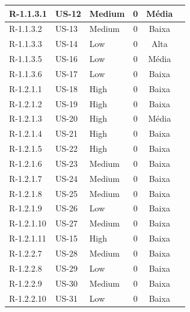 \begin{table}
\begin{tabular}{ | l | l | l | c | c | c |}
R-1.1.3.1  & US-12 & Medium   & 0                & Média       &                 \\\hline
R-1.1.3.2  & US-13 & Medium   & 0                & Baixa       &                 \\\hline
R-1.1.3.3  & US-14 & Low      & 0                & Alta        &                 \\\hline
R-1.1.3.5  & US-16 & Low      & 0                & Média       &                 \\\hline
R-1.1.3.6  & US-17 & Low      & 0                & Baixa       &                 \\\hline
R-1.2.1.1  & US-18 & High     & 0                & Baixa       &                 \\\hline
R-1.2.1.2  & US-19 & High     & 0                & Baixa       &                 \\\hline
R-1.2.1.3  & US-20 & High     & 0                & Média       &                 \\\hline
R-1.2.1.4  & US-21 & High     & 0                & Baixa       &                 \\\hline
R-1.2.1.5  & US-22 & High     & 0                & Baixa       &                 \\\hline
R-1.2.1.6  & US-23 & Medium   & 0                & Baixa       &                 \\\hline
R-1.2.1.7  & US-24 & Medium   & 0                & Baixa       &                 \\\hline
R-1.2.1.8  & US-25 & Medium   & 0                & Baixa       &                 \\\hline
R-1.2.1.9  & US-26 & Low      & 0                & Baixa       &                 \\\hline
R-1.2.1.10 & US-27 & Medium   & 0                & Baixa       &                 \\\hline
R-1.2.1.11 & US-15 & High     & 0                & Baixa       &                 \\\hline
R-1.2.2.7  & US-28 & Medium   & 0                & Baixa       &                 \\\hline
R-1.2.2.8  & US-29 & Low      & 0                & Baixa       &                 \\\hline
R-1.2.2.9  & US-30 & Medium   & 0                & Baixa       &                 \\\hline
R-1.2.2.10 & US-31 & Low      & 0                & Baixa       &                 \\\hline

\end{tabular}
\end{table}
